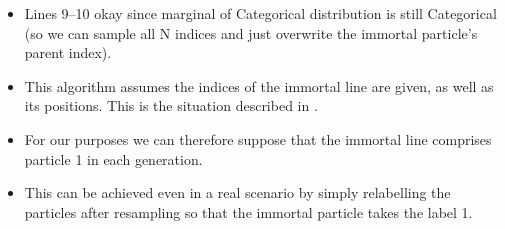 \documentclass[fleqn]{article}
\begin{document}
\begin{itemize}
\item Lines 9--10 okay since marginal of Categorical distribution is still Categorical (so we can sample all N indices and just overwrite the immortal particle's parent index).
\item This algorithm assumes the indices of the immortal line are given, as well as its positions. This is the situation described in \citet{andrieu2010}.
\item For our purposes we can therefore suppose that the immortal line comprises particle 1 in each generation.
\item This can be achieved even in a real scenario by simply relabelling the particles after resampling so that the immortal particle takes the label 1.
\end{itemize}


\end{document}
